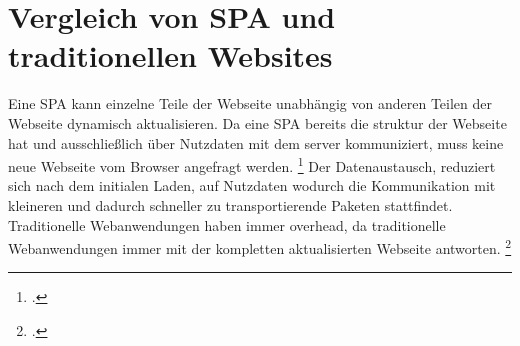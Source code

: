 \section{Vergleich von \ac{SPA} und traditionellen Websites}
Eine \ac{SPA} kann einzelne Teile der Webseite unabhängig von anderen Teilen der Webseite dynamisch aktualisieren.
Da eine \ac{SPA} bereits die \gls{struktur} der Webseite hat und ausschließlich über Nutzdaten mit dem \gls{server} kommuniziert,
muss keine neue Webseite vom Browser angefragt werden. \footcite[Vgl.][Seite 12]{Scott2015}
Der Datenaustausch, reduziert sich nach dem initialen Laden, 
auf Nutzdaten wodurch die Kommunikation mit kleineren und dadurch schneller zu transportierende Paketen stattfindet. 
Traditionelle Webanwendungen haben immer \gls{overhead}, da traditionelle Webanwendungen
immer mit der kompletten aktualisierten Webseite antworten. \footcite[Vgl.][Seite 502]{Flanagan2011}
